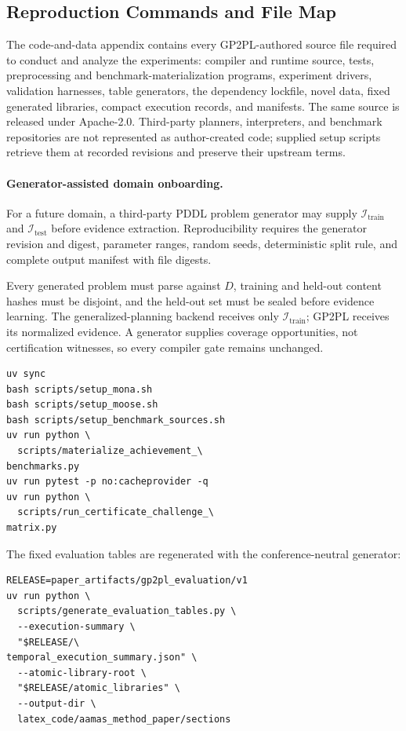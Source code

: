 \subsection{Reproduction Commands and File Map}

The code-and-data appendix contains every GP2PL-authored source file required to
conduct and analyze the experiments: compiler and runtime source, tests,
preprocessing and benchmark-materialization programs, experiment drivers,
validation harnesses, table generators, the dependency lockfile, novel data,
fixed generated libraries, compact execution records, and manifests. The same
source is released under Apache-2.0. Third-party planners, interpreters, and
benchmark repositories are not represented as author-created code; supplied
setup scripts retrieve them at recorded revisions and preserve their upstream
terms.

\paragraph{Generator-assisted domain onboarding.}
For a future domain, a third-party PDDL problem generator may supply
$\mathcal I_{\mathrm{train}}$ and $\mathcal I_{\mathrm{test}}$ before evidence
extraction. Reproducibility requires the generator revision and digest,
parameter ranges, random seeds, deterministic split rule, and complete output
manifest with file digests.

Every generated problem must parse against $D$, training and held-out content
hashes must be disjoint, and the held-out set must be sealed before evidence
learning. The generalized-planning backend receives only
$\mathcal I_{\mathrm{train}}$; GP2PL receives its normalized evidence. A
generator supplies coverage opportunities, not certification witnesses, so every compiler
gate remains unchanged.

\begingroup
\small
\begin{verbatim}
uv sync
bash scripts/setup_mona.sh
bash scripts/setup_moose.sh
bash scripts/setup_benchmark_sources.sh
uv run python \
  scripts/materialize_achievement_\
benchmarks.py
uv run pytest -p no:cacheprovider -q
uv run python \
  scripts/run_certificate_challenge_\
matrix.py
\end{verbatim}
\endgroup

The fixed evaluation tables are regenerated with the conference-neutral
generator:

\begingroup
\small
\begin{verbatim}
RELEASE=paper_artifacts/gp2pl_evaluation/v1
uv run python \
  scripts/generate_evaluation_tables.py \
  --execution-summary \
  "$RELEASE/\
temporal_execution_summary.json" \
  --atomic-library-root \
  "$RELEASE/atomic_libraries" \
  --output-dir \
  latex_code/aamas_method_paper/sections
\end{verbatim}
\endgroup

